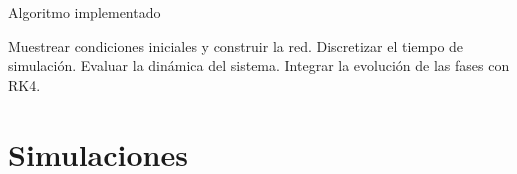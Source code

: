 \documentclass{beamer}
\begin{document}
\begin{frame}{Algoritmo implementado}
  \begin{algorithm}[H]
    \small
    \caption{Bucle principal del motor}
    \begin{algorithmic}[1]
      \State Muestrear condiciones iniciales y construir la red.
      \State Discretizar el tiempo de simulaci\'on.
        \State Evaluar la din\'amica del sistema.
        \State Integrar la evoluci\'on de las fases con RK4.
      \EndFor
    \end{algorithmic}
  \end{algorithm}
\end{frame}

\section{Simulaciones}
\end{document}
